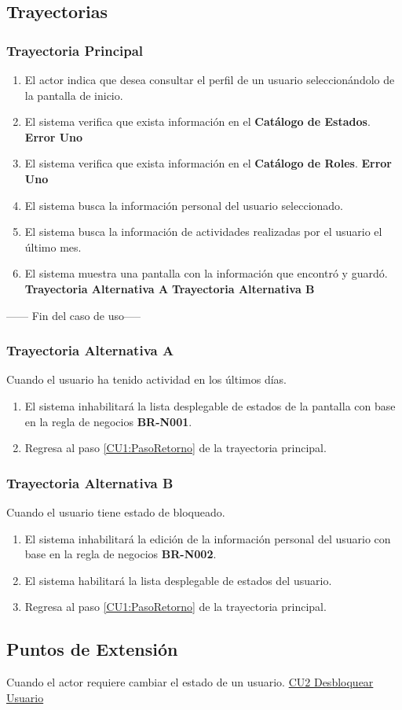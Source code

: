 \subsection{Trayectorias}

\subsubsection{Trayectoria Principal}

	\begin{enumerate}
		\item El actor indica que desea consultar el perfil de un usuario seleccionándolo de la pantalla de inicio.
		\item El sistema verifica que exista información en el \textbf{Catálogo de Estados}. \textbf{Error Uno}
		\item El sistema verifica que exista información en el \textbf{Catálogo de Roles}. \textbf{Error Uno}
		\item El sistema busca la información personal del usuario seleccionado.
		\item El sistema busca la información de actividades realizadas por el usuario el último mes.
		\item El sistema muestra una pantalla con la información que encontró y guardó. \label{CU1:PasoRetorno}\textbf{Trayectoria Alternativa A} \textbf{Trayectoria Alternativa B}
	\end{enumerate}
	
------	Fin del caso de uso-----

\subsubsection{Trayectoria Alternativa A}
Cuando el usuario  ha tenido actividad en los últimos días.
	\begin{enumerate}
		\item El sistema inhabilitará la lista desplegable de estados de la pantalla con base en la regla de negocios \textbf{BR-N001}.
		\item Regresa al paso \ref{CU1:PasoRetorno} de la trayectoria principal.
	\end{enumerate}
	
\subsubsection{Trayectoria Alternativa B}
Cuando el usuario tiene estado de bloqueado.
	\begin{enumerate}
		\item El sistema inhabilitará la edición de la información personal del usuario con base en la regla de negocios \textbf{BR-N002}.
		\item El sistema habilitará la lista desplegable de estados del usuario.
		\item Regresa al paso \ref{CU1:PasoRetorno} de la trayectoria principal.
	\end{enumerate}

\subsection{Puntos de Extensión}

Cuando el actor requiere cambiar el estado de un usuario. \hyperlink{CU2}{CU2 Desbloquear Usuario}
